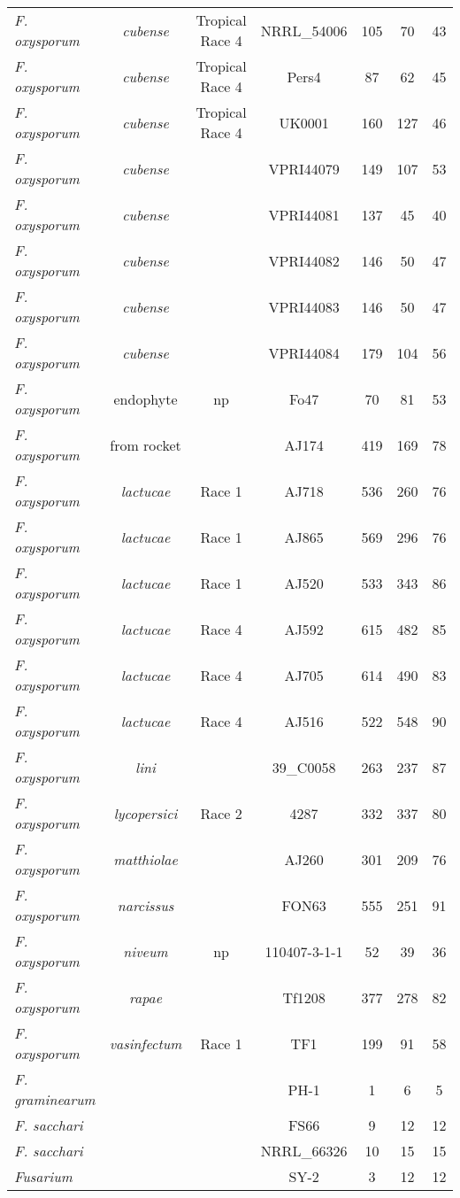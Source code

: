 \begin{longtable}{@{}lcccccc@{}}
\textit{F. oxysporum} & \textit{cubense} & Tropical Race 4 & NRRL\_54006 & 105 & 70 & 43 \\
\textit{F. oxysporum} & \textit{cubense} & Tropical Race 4 & Pers4 & 87 & 62 & 45 \\
\textit{F. oxysporum} & \textit{cubense} & Tropical Race 4 & UK0001 & 160 & 127 & 46 \\
\textit{F. oxysporum} & \textit{cubense} &  & VPRI44079 & 149 & 107 & 53 \\
\textit{F. oxysporum} & \textit{cubense} &  & VPRI44081 & 137 & 45 & 40 \\
\textit{F. oxysporum} & \textit{cubense} &  & VPRI44082 & 146 & 50 & 47 \\
\textit{F. oxysporum} & \textit{cubense} &  & VPRI44083 & 146 & 50 & 47 \\
\textit{F. oxysporum} & \textit{cubense} &  & VPRI44084 & 179 & 104 & 56 \\
\textit{F. oxysporum} & endophyte & np & Fo47 & 70 & 81 & 53 \\
\textit{F. oxysporum} & from rocket &  & AJ174 & 419 & 169 & 78 \\
\textit{F. oxysporum} & \textit{lactucae} & Race 1 & AJ718 & 536 & 260 & 76 \\
\textit{F. oxysporum} & \textit{lactucae} & Race 1 & AJ865 & 569 & 296 & 76 \\
\textit{F. oxysporum} & \textit{lactucae} & Race 1 & AJ520 & 533 & 343 & 86 \\
\textit{F. oxysporum} & \textit{lactucae} & Race 4 & AJ592 & 615 & 482 & 85 \\
\textit{F. oxysporum} & \textit{lactucae} & Race 4 & AJ705 & 614 & 490 & 83 \\
\textit{F. oxysporum} & \textit{lactucae} & Race 4 & AJ516 & 522 & 548 & 90 \\
\textit{F. oxysporum} & \textit{lini} &  & 39\_C0058 & 263 & 237 & 87 \\
\textit{F. oxysporum} & \textit{lycopersici} & Race 2 & 4287 & 332 & 337 & 80 \\
\textit{F. oxysporum} & \textit{matthiolae} &  & AJ260 & 301 & 209 & 76 \\
\textit{F. oxysporum} & \textit{narcissus} &  & FON63 & 555 & 251 & 91 \\
\textit{F. oxysporum} & \textit{niveum} & np & 110407-3-1-1 & 52 & 39 & 36 \\
\textit{F. oxysporum} & \textit{rapae} &  & Tf1208 & 377 & 278 & 82 \\
\textit{F. oxysporum} & \textit{vasinfectum} & Race 1 & TF1 & 199 & 91 & 58 \\
\textit{F. graminearum} &  &  & PH-1 & 1 & 6 & 5 \\
\textit{F. sacchari} &  &  & FS66 & 9 & 12 & 12 \\
\textit{F. sacchari} &  &  & NRRL\_66326 & 10 & 15 & 15 \\
\textit{Fusarium} &  &  & SY-2 & 3 & 12 & 12 \\* \bottomrule
\end{longtable}

\endgroup